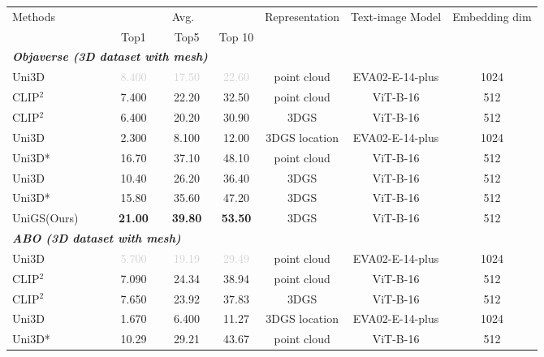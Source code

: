 \begin{table}[t]
\centering
  \addtolength{\tabcolsep}{-0.8pt}
 \begin{tabularx}{\textwidth}{  l | c c c | c  |c  | c }
\toprule
\multirow{2}{*}{Methods}  & \multicolumn{3}{c|}{Avg.} & \multirow{2}{*}{Representation} & \multirow{2}{*}{Text-image Model} & \multirow{2}{*}{Embedding dim} \\
 & Top1 & Top5 & Top 10 & & \\

 \midrule  \midrule
    \multicolumn{3}{l}{\textit{\textbf{Objaverse (3D dataset with mesh)}}} \\
    \midrule

Uni3D & \textcolor{lightgray}{8.400} & \textcolor{lightgray}{17.50} & \textcolor{lightgray}{22.60} & point cloud & EVA02-E-14-plus & 1024\\
\midrule
 CLIP$^2$ & 7.400 & 22.20 & 32.50 & point cloud & ViT-B-16 & 512\\
  CLIP$^2$ & 6.400 & 20.20 & 30.90 & 3DGS & ViT-B-16 & 512\\
  Uni3D & 2.300 & 8.100 & 12.00 & 3DGS location & EVA02-E-14-plus & 1024\\
  Uni3D* & 16.70 & 37.10 & 48.10 & point cloud & ViT-B-16 & 512\\
  Uni3D & 10.40 & 26.20 & 36.40 & 3DGS & ViT-B-16 & 512\\
  Uni3D* & 15.80 & 35.60 & 47.20 & 3DGS & ViT-B-16 & 512\\
\midrule
\rowcolor{mygray} UniGS(Ours) & \textbf{21.00} & \textbf{39.80} & \textbf{53.50} & 3DGS & ViT-B-16 & 512\\
%
 \midrule  \midrule
    \multicolumn{3}{l}{\textit{\textbf{ABO (3D dataset with mesh)}}} \\
    \midrule
Uni3D & \textcolor{lightgray}{5.700} & \textcolor{lightgray}{19.19} & \textcolor{lightgray}{29.49} & point cloud & EVA02-E-14-plus & 1024\\
\midrule
CLIP$^2$ & 7.090 & 24.34 & 38.94 & point cloud & ViT-B-16 & 512\\
  CLIP$^2$ & 7.650 & 23.92 & 37.83 & 3DGS & ViT-B-16 & 512\\
  Uni3D & 1.670 & 6.400 & 11.27 & 3DGS location & EVA02-E-14-plus & 1024\\
  Uni3D* & 10.29 & 29.21 & 43.67 & point cloud & ViT-B-16 & 512\\


\end{tabularx}
\end{table}
